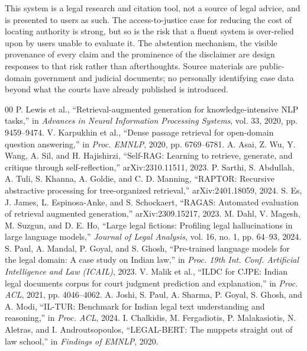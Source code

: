 \documentclass[conference]{IEEEtran}
\begin{document}
This system is a legal research and citation tool, not a source of legal advice, and is presented to users as such. The access-to-justice case for reducing the cost of locating authority is strong, but so is the risk that a fluent system is over-relied upon by users unable to evaluate it. The abstention mechanism, the visible provenance of every claim and the prominence of the disclaimer are design responses to that risk rather than afterthoughts. Source materials are public-domain government and judicial documents; no personally identifying case data beyond what the courts have already published is introduced.

\begin{thebibliography}{00}
 P. Lewis et al., ``Retrieval-augmented generation for knowledge-intensive NLP tasks,'' in \textit{Advances in Neural Information Processing Systems}, vol. 33, 2020, pp. 9459--9474.
 V. Karpukhin et al., ``Dense passage retrieval for open-domain question answering,'' in \textit{Proc. EMNLP}, 2020, pp. 6769--6781.
 A. Asai, Z. Wu, Y. Wang, A. Sil, and H. Hajishirzi, ``Self-RAG: Learning to retrieve, generate, and critique through self-reflection,'' arXiv:2310.11511, 2023.
 P. Sarthi, S. Abdullah, A. Tuli, S. Khanna, A. Goldie, and C. D. Manning, ``RAPTOR: Recursive abstractive processing for tree-organized retrieval,'' arXiv:2401.18059, 2024.
 S. Es, J. James, L. Espinosa-Anke, and S. Schockaert, ``RAGAS: Automated evaluation of retrieval augmented generation,'' arXiv:2309.15217, 2023.
 M. Dahl, V. Magesh, M. Suzgun, and D. E. Ho, ``Large legal fictions: Profiling legal hallucinations in large language models,'' \textit{Journal of Legal Analysis}, vol. 16, no. 1, pp. 64--93, 2024.
 S. Paul, A. Mandal, P. Goyal, and S. Ghosh, ``Pre-trained language models for the legal domain: A case study on Indian law,'' in \textit{Proc. 19th Int. Conf. Artificial Intelligence and Law (ICAIL)}, 2023.
 V. Malik et al., ``ILDC for CJPE: Indian legal documents corpus for court judgment prediction and explanation,'' in \textit{Proc. ACL}, 2021, pp. 4046--4062.
 A. Joshi, S. Paul, A. Sharma, P. Goyal, S. Ghosh, and A. Modi, ``IL-TUR: Benchmark for Indian legal text understanding and reasoning,'' in \textit{Proc. ACL}, 2024.
 I. Chalkidis, M. Fergadiotis, P. Malakasiotis, N. Aletras, and I. Androutsopoulos, ``LEGAL-BERT: The muppets straight out of law school,'' in \textit{Findings of EMNLP}, 2020.

\end{thebibliography}
\end{document}

